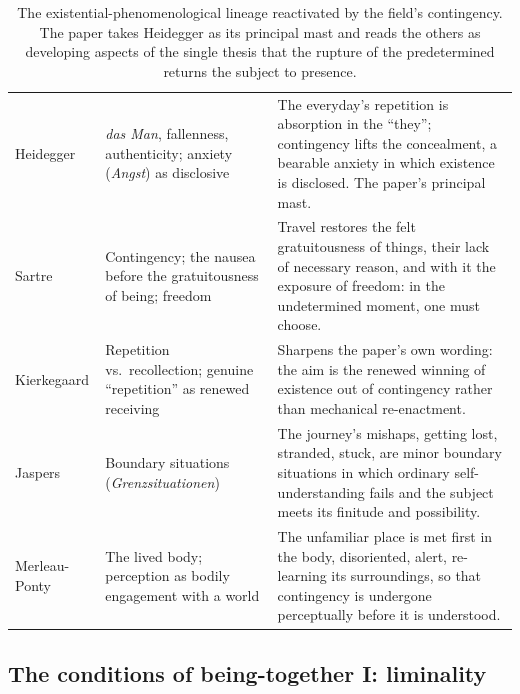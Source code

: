 \begin{table}[ht]
\centering
\small
\begin{tabularx}{\linewidth}{L{3.0cm} L{3.3cm} Z}
 &  &  \\
\midrule
Heidegger \parencite{heidegger1962b} & \emph{das Man}, fallenness, authenticity; anxiety (\emph{Angst}) as disclosive & The everyday's repetition is absorption in the ``they''; contingency lifts the concealment, a bearable anxiety in which existence is disclosed. The paper's principal mast. \\
Sartre \parencite{sartre1964,sartre1956} & Contingency; the nausea before the gratuitousness of being; freedom & Travel restores the felt gratuitousness of things, their lack of necessary reason, and with it the exposure of freedom: in the undetermined moment, one must choose. \\
Kierkegaard \parencite{kierkegaard1983} & Repetition vs.\ recollection; genuine ``repetition'' as renewed receiving & Sharpens the paper's own wording: the aim is the renewed winning of existence out of contingency rather than mechanical re-enactment. \\
Jaspers \parencite{jaspers1970} & Boundary situations (\emph{Grenzsituationen}) & The journey's mishaps, getting lost, stranded, stuck, are minor boundary situations in which ordinary self-understanding fails and the subject meets its finitude and possibility. \\
Merleau-Ponty \parencite{merleauponty2012} & The lived body; perception as bodily engagement with a world & The unfamiliar place is met first in the body, disoriented, alert, re-learning its surroundings, so that contingency is undergone perceptually before it is understood. \\
\end{tabularx}
\caption{The existential-phenomenological lineage reactivated by the field's contingency. The paper takes Heidegger as its principal mast and reads the others as developing aspects of the single thesis that the rupture of the predetermined returns the subject to presence.}
\label{p21:tab:existential}
\end{table}

\subsection{The conditions of being-together I: liminality}
\label{p21:sub:field-liminality}

